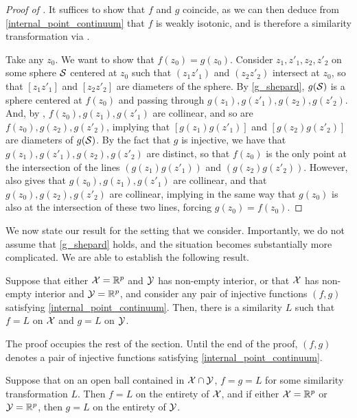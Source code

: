 \documentclass[twoside, 11pt]{article}
\begin{document}
\begin{proof}[Proof of ]
It suffices to show that $f$ and $g$ coincide, as we can then deduce from \eqref{internal_point_continuum} that $f$ is weakly isotonic, and is therefore a similarity transformation via . 

Take any $z_0$. We want to show that $f(z_0) = g(z_0)$.
Consider $z_1,z'_1, z_2,z'_2$ on some sphere $\mathcal{S}$ centered at $z_0$ such that $(z_1z'_1)$ and $ (z_2z'_2)$ intersect at $z_0$, so that $[z_1z'_1]$ and $[z_2z'_2]$ are diameters of the sphere. 
By \eqref{g_shepard}, $g(\mathcal{S})$ is a sphere centered at $f(z_0)$ and passing through $g(z_1),g(z'_1),g(z_2),g(z'_2)$. 
And, by , $f(z_0),g(z_1),g(z'_1)$ are collinear, and so are $f(z_0),g(z_2),g(z'_2)$, implying that $[g(z_1)g(z'_1)]$ and $[g(z_2)g(z'_2)]$ are diameters of $g(\mathcal{S})$. By the fact that $g$ is injective, we have that $g(z_1),g(z'_1),g(z_2),g(z'_2)$ are distinct, so that $f(z_0)$ is the only point at the intersection of the lines $(g(z_1)g(z'_1))$ and $(g(z_2)g(z'_2))$. However,  also gives that $g(z_0),g(z_1),g(z'_1)$ are collinear, and that $g(z_0),g(z_2),g(z'_2)$ are collinear, implying in the same way that $g(z_0)$ is also at the intersection of these two lines, forcing $g(z_0) = f(z_0)$.
\end{proof}

We now state our result for the setting that we consider. Importantly, we do not assume that \eqref{g_shepard} holds, and the situation becomes substantially more complicated. 
We are able to establish the following result. 

\begin{theorem} \label{thm:internal_point}
Suppose that either $\mathcal{X} = \mathbb{R}^p$ and $\mathcal{Y}$ has non-empty interior, or that $\mathcal{X}$ has non-empty interior and $\mathcal{Y} = \mathbb{R}^p$, and consider any pair of injective functions $(f,g)$ satisfying \eqref{internal_point_continuum}. Then, there is a similarity $L$ such that $f = L$ on $\mathcal{X}$ and $g = L$ on $\mathcal{Y}$. 
\end{theorem}

The proof occupies the rest of the section. Until the end of the proof, $(f,g)$ denotes a pair of injective functions satisfying \eqref{internal_point_continuum}.

\begin{proposition}
Suppose that on an open ball contained in $\mathcal{X} \cap \mathcal{Y}$, $f = g = L$ for some similarity transformation $L$. Then $f = L$ on the entirety of $\mathcal{X}$, and if either $\mathcal{X} = \mathbb{R}^p$ or $\mathcal{Y} = \mathbb{R}^p$, then $g = L$ on the entirety of $\mathcal{Y}$.
\end{proposition}
 
\end{document}
